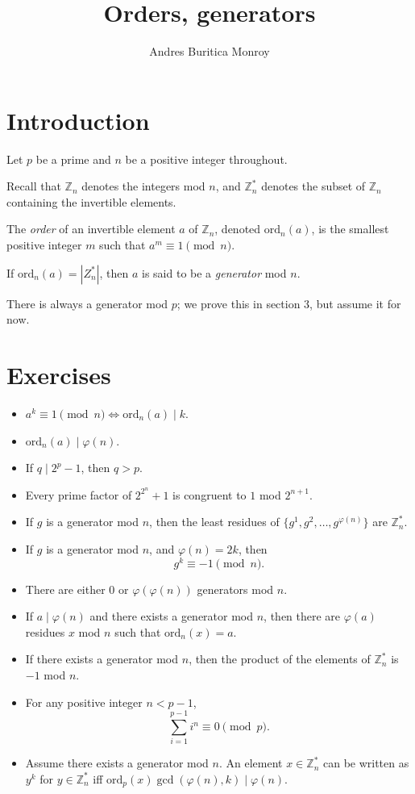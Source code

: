 \documentclass{article}
\title{Orders, generators}
\author{Andres Buritica Monroy}
\date{}
\newcommand\Zz{\mathbb{Z}}
\newcommand\ord{\mathrm{ord}}
\begin{document}
\maketitle
\section{Introduction}
  Let $p$ be a prime and $n$ be a positive integer throughout.

  Recall that $\Zz_n$ denotes the integers mod $n$, and $\Zz_n^*$ denotes the
  subset of $\Zz_n$ containing the invertible elements.

  The \emph{order} of an invertible element $a$ of $\Zz_n$, denoted $\ord_n(a)$,
  is the smallest positive integer $m$ such that $a^m\equiv 1\pmod n$.

  If $\ord_n(a)=|Z_n^*|$, then $a$ is said to be a \emph{generator} mod $n$.

  There is always a generator mod $p$; we prove this in section 3, but assume it for
  now.
\section{Exercises}
\begin{itemize}
  \item $a^k\equiv 1\pmod n \iff \ord_n(a)\mid k$.
  \item $\ord_n(a)\mid\varphi(n)$.
  \item If $q\mid 2^p-1$, then $q>p$.
  \item Every prime factor of $2^{2^n}+1$ is congruent to $1$ mod $2^{n+1}$.
  \item If $g$ is a generator mod $n$, then the least residues of
    $\{g^1,g^2,\ldots,g^{\varphi(n)}\}$ are $\Zz_n^*$.
  \item If $g$ is a generator mod $n$, and $\varphi(n)=2k$, then
    \[g^k\equiv -1\pmod n.\]
  \item There are either $0$ or $\varphi(\varphi(n))$ generators mod $n$.
  \item If $a\mid\varphi(n)$ and there exists a generator mod $n$, then 
    there are $\varphi(a)$ residues $x$ mod $n$ such that $\ord_n(x)=a$.
  \item If there exists a generator mod $n$, then the product of the elements of
    $\Zz_n^*$ is $-1$ mod $n$.
  \item For any positive integer $n<p-1$,
    \[\sum_{i=1}^{p-1} i^n\equiv 0\pmod p.\]
  \item Assume there exists a generator mod $n$.
    An element $x\in\Zz_n^*$ can be written as $y^k$ for $y\in\Zz_n^*$ iff
    $\ord_p(x)\gcd(\varphi(n),k)\mid \varphi(n)$.
\end{itemize}
\end{document}
